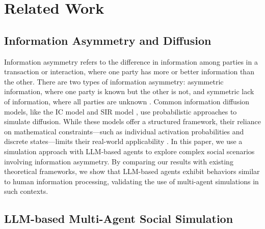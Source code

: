\section{Related Work}


\subsection{Information Asymmetry and Diffusion}


Information asymmetry \cite{b58,b35,b29} refers to the difference in information among parties in a transaction or interaction, where one party has more or better information than the other. 
There are two types of information asymmetry: asymmetric information, where one party is known but the other is not, and symmetric lack of information, where all parties are unknown \cite{b30}. 
Common information diffusion models, like the IC model \cite{b57} and SIR model \cite{b56}, use probabilistic approaches to simulate diffusion. 
While these models offer a structured framework, their reliance on mathematical constraints—such as individual activation probabilities and discrete states—limits their real-world applicability \cite{b55}.
In this paper, we use a simulation approach with LLM-based agents to explore complex social scenarios involving information asymmetry. 
By comparing our results with existing theoretical frameworks, we show that LLM-based agents exhibit behaviors similar to human information processing, validating the use of multi-agent simulations in such contexts.



\subsection{LLM-based Multi-Agent Social Simulation}


